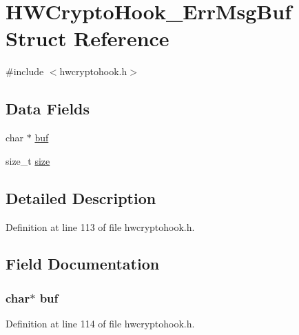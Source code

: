 \hypertarget{struct_h_w_crypto_hook___err_msg_buf}{}\section{H\+W\+Crypto\+Hook\+\_\+\+Err\+Msg\+Buf Struct Reference}
\label{struct_h_w_crypto_hook___err_msg_buf}


{\ttfamily \#include $<$hwcryptohook.\+h$>$}

\subsection*{Data Fields}
\begin{DoxyCompactItemize}
\item 
char $\ast$ \hyperlink{struct_h_w_crypto_hook___err_msg_buf_a1fe855c208bc17a51a4d34fefdb2d5b1}{buf}
\item 
size\+\_\+t \hyperlink{struct_h_w_crypto_hook___err_msg_buf_a854352f53b148adc24983a58a1866d66}{size}
\end{DoxyCompactItemize}


\subsection{Detailed Description}


Definition at line 113 of file hwcryptohook.\+h.



\subsection{Field Documentation}
\subsubsection[{\texorpdfstring{buf}{buf}}]{\setlength{\rightskip}{0pt plus 5cm}char$\ast$ buf}\hypertarget{struct_h_w_crypto_hook___err_msg_buf_a1fe855c208bc17a51a4d34fefdb2d5b1}{}\label{struct_h_w_crypto_hook___err_msg_buf_a1fe855c208bc17a51a4d34fefdb2d5b1}


Definition at line 114 of file hwcryptohook.\+h.


